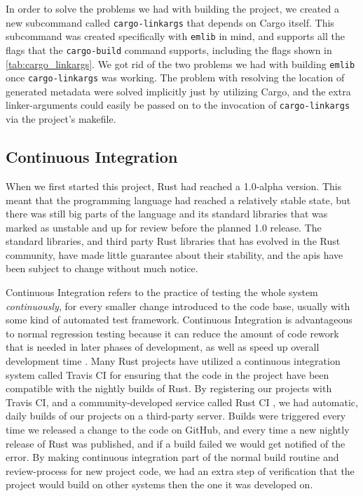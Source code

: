 In order to solve the problems we had with building the project, we created a new subcommand called \texttt{cargo-linkargs} \cite{github:cargo_linkargs} that depends on Cargo itself.
This subcommand was created specifically with \texttt{emlib} in mind, and supports all the flags that the \texttt{cargo-build} command supports, including the flags shown in \autoref{tab:cargo_linkargs}.
We got rid of the two problems we had with building \texttt{emlib} once \texttt{cargo-linkargs} was working.
The problem with resolving the location of generated metadata were solved implicitly just by utilizing Cargo, and the extra linker-arguments could easily be passed on to the invocation of \texttt{cargo-linkargs} via the project's makefile.

\subsection{Continuous Integration}
\label{ssub:continuous_integration}

When we first started this project, Rust had reached a 1.0-alpha version.
This meant that the programming language had reached a relatively stable state, but there was still big parts of the language and its standard libraries that was marked as unstable and up for review before the planned 1.0 release.
The standard libraries, and third party Rust libraries that has evolved in the Rust community, have made little guarantee about their stability, and the \glspl{api} have been subject to change without much notice.

Continuous Integration refers to the practice of testing the whole system \emph{continuously}, for every smaller change introduced to the code base, usually with some kind of automated test framework.
Continuous Integration is advantageous to normal regression testing because it can reduce the amount of code rework that is needed in later phases of development, as well as speed up overall development time  \cite{Orso2014}.
Many Rust projects have utilized a continuous integration system called Travis CI \cite{web:travis_ci} for ensuring that the code in the project have been compatible with the nightly builds of Rust.
By registering our projects with Travis CI, and a community-developed service called Rust CI \cite{web:rust_ci}, we had automatic, daily builds of our projects on a third-party server.
Builds were triggered every time we released a change to the code on GitHub, and every time a new nightly release of Rust was published, and if a build failed we would get notified of the error.
By making continuous integration part of the normal build routine and review-process for new project code, we had an extra step of verification that the project would build on other systems then the one it was developed on.

